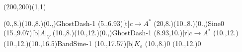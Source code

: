\unitlength=1bp%

\begin{feynartspicture}(200,200)(1,1)

\FADiagram{}
\FAProp(0.,8.)(10.,8.)(0.,){GhostDash}{-1}
\FALabel(5.,6.93)[t]{$c\to A^*$}
\FAProp(20,8.)(10.,8.)(0.,){Sine}{0}
\FALabel(15.,9.07)[b]{$A|_V$}
\FAProp(10.,8.)(10.,12.)(0.,){GhostDash}{-1}
\FALabel(8.93,10.)[r]{$c\to A^*$}
\FAProp(10.,12.)(10.,12.)(10.,16.5){BandSine}{-1}
\FALabel(10.,17.57)[b]{$K_\varepsilon$}
\FAVert(10.,8.){0}
\FAVert(10.,12.){0}
\end{feynartspicture}

